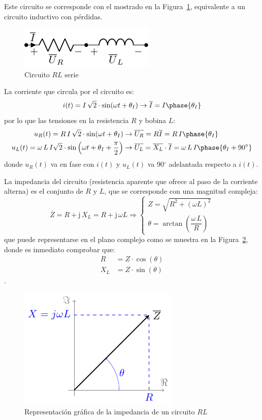 	Este circuito se corresponde con el mostrado en la Figura~\ref{fig.RL}, equivalente a un circuito inductivo con pérdidas. 
	\begin{figure}[H]
		\centering
		\includegraphics[width=0.3\linewidth]{../figs/RL.pdf}
		\caption{Circuito $RL$ serie}
		\label{fig.RL}
	\end{figure}
	
	La corriente que circula por el circuito es:
	\begin{equation*}
		i(t)=I\,\sqrt{2}\cdot\sin(\omega t+\theta_I)\rightarrow\overline{I}=I\phase{\theta_I}
	\end{equation*}
	por lo que las tensiones en la resistencia $R$ y bobina $L$:
	\begin{align*}
		u_R(t)=R\, I\,\sqrt{2}\cdot\sin(\omega t+\theta_I)&\rightarrow \overline{U_R} = R \overline{I}=R\,I\phase{\theta_I}\\ 
		u_L(t)= \omega\,L\,I \sqrt{2}\cdot \sin \left(\omega t+\theta_I+\frac{\pi}{2}\right)&\rightarrow \overline{U_L}=\overline{X_L}\cdot\overline{I}= \omega\,L\,I\phase{\theta_I+90^\circ}
	\end{align*}
	donde $u_R(t)$ va en fase con $i(t)$ y $u_L(t)$ va 90$^\circ$ adelantada respecto a $i(t)$.  
	
	La impedancia del circuito (resistencia aparente que ofrece al paso de la corriente alterna) es el conjunto de $R$ y $L$, que se corresponde con una magnitud compleja: 
	\begin{equation}
		\boxed{ \overline{Z} = R + \mathrm{j}\,X_L = R+ \mathrm{j}\,\omega L \Rightarrow 
			\begin{cases}
				Z=\sqrt{R^2+(\omega L)^2}\\
				\theta=\arctan\left(\dfrac{\omega\,L}{R} \right)
		\end{cases}}
	\end{equation}
	que puede representarse en el plano complejo como se muestra en la Figura~\ref{fig.fasorinductanciareal}, donde es inmediato comprobar que:
	\begin{align*}
		R&=Z\cdot\cos(\theta)\\
		X_L&=Z\cdot\sin(\theta)
	\end{align*}. 
	\begin{figure}[H]
		\centering
		\includegraphics{../figs/fasorInductanciaReal.pdf}
		\caption{Representación gráfica de la impedancia de un circuito $RL$}
		\label{fig.fasorinductanciareal}
	\end{figure}
	
